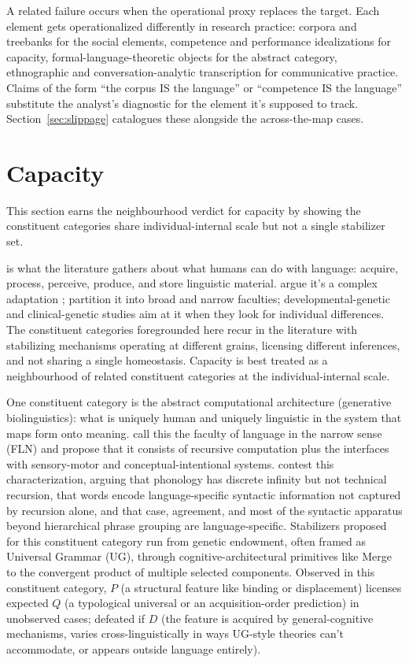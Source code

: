 \documentclass[12pt]{article}
\begin{document}
A related failure occurs when the operational proxy replaces the target. Each element gets operationalized differently in research practice: corpora and treebanks for the social elements, competence and performance idealizations for capacity, formal-language-theoretic objects for the abstract category, ethnographic and conversation-analytic transcription for communicative practice. Claims of the form \enquote{the corpus IS the language} or \enquote{competence IS the language} substitute the analyst's diagnostic for the element it's supposed to track. Section~\ref{sec:slippage} catalogues these alongside the across-the-map cases.

\section{Capacity}\label{sec:capacity}

This section earns the neighbourhood verdict for capacity by showing the constituent categories share individual-internal scale but not a single stabilizer set.

 is what the literature gathers about what humans can do with language: acquire, process, perceive, produce, and store linguistic material. \citeauthor{pinkerbloom1990} argue it's a complex adaptation \citep{pinkerbloom1990}; \textcite{hauser2002} partition it into broad and narrow faculties; developmental-genetic and clinical-genetic studies aim at it when they look for individual differences. The constituent categories foregrounded here recur in the literature with stabilizing mechanisms operating at different grains, licensing different inferences, and not sharing a single homeostasis. Capacity is best treated as a neighbourhood of related constituent categories at the individual-internal scale.

One constituent category is the abstract computational architecture (generative biolinguistics): what is uniquely human and uniquely linguistic in the system that maps form onto meaning. \textcite{hauser2002} call this the faculty of language in the narrow sense (FLN) and propose that it consists of recursive computation plus the interfaces with sensory-motor and conceptual-intentional systems. \textcite{pinkerjackendoff2005} contest this characterization, arguing that phonology has discrete infinity but not technical recursion, that words encode language-specific syntactic information not captured by recursion alone, and that case, agreement, and most of the syntactic apparatus beyond hierarchical phrase grouping are language-specific. Stabilizers proposed for this constituent category run from genetic endowment, often framed as Universal Grammar (UG), through cognitive-architectural primitives like Merge to the convergent product of multiple selected components. Observed in this constituent category, $P$ (a structural feature like binding or displacement) licenses expected $Q$ (a typological universal or an acquisition-order prediction) in unobserved cases; defeated if $D$ (the feature is acquired by general-cognitive mechanisms, varies cross-linguistically in ways UG-style theories can't accommodate, or appears outside language entirely).
\end{document}
